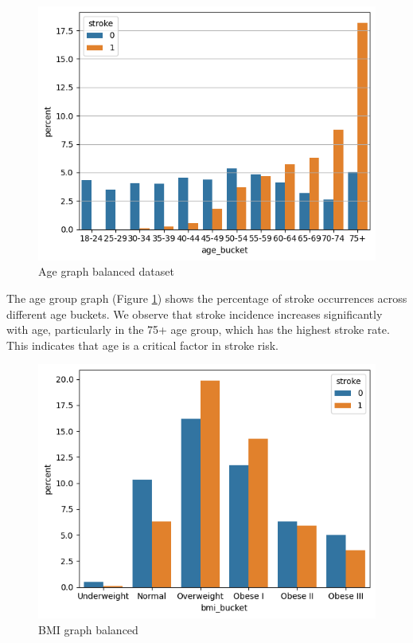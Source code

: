 \documentclass{Configuration_Files/Template}
\begin{document}
\begin{figure}[h]
\centering
\includegraphics[scale=0.4]{Images/age_graph.png}
\caption{Age graph balanced dataset}
\label{fig:age_balanced}
\end{figure}

The age group graph (Figure \ref{fig:age_balanced}) shows the percentage of stroke occurrences across different age buckets. We observe that stroke incidence increases significantly with age, particularly in the 75+ age group, which has the highest stroke rate. This indicates that age is a critical factor in stroke risk.

\begin{figure}[h]
\centering
\includegraphics[scale=0.4]{Images/bmi_graph.png}
\caption{BMI graph balanced}
\label{fig:bmi_balanced}
\end{figure}
\end{document}
